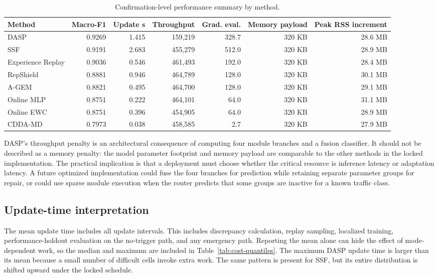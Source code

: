 \begin{table}[t]
\caption{Confirmation-level performance summary by method.}
\label{tab:performance-audit}
\centering
\scriptsize
\begin{tabular}{lrrrrrr}
\toprule
Method & Macro-F1 & Update s & Throughput & Grad. eval. & Memory payload & Peak RSS increment\\
\midrule
DASP & 0.9269 & 1.415 & 159,219 & 328.7 & 320 KB & 28.6 MB\\
SSF & 0.9191 & 2.683 & 455,279 & 512.0 & 320 KB & 28.9 MB\\
Experience Replay & 0.9036 & 0.546 & 461,493 & 192.0 & 320 KB & 28.4 MB\\
RepShield & 0.8881 & 0.946 & 464,789 & 128.0 & 320 KB & 30.1 MB\\
A-GEM & 0.8821 & 0.495 & 464,700 & 128.0 & 320 KB & 29.1 MB\\
Online MLP & 0.8751 & 0.222 & 464,101 & 64.0 & 320 KB & 31.1 MB\\
Online EWC & 0.8751 & 0.396 & 454,905 & 64.0 & 320 KB & 28.9 MB\\
CDDA-MD & 0.7973 & 0.038 & 458,585 & 2.7 & 320 KB & 27.9 MB\\
\bottomrule
\end{tabular}
\end{table}

DASP's throughput penalty is an architectural consequence of computing four module branches and a fusion classifier. It should not be described as a memory penalty: the model parameter footprint and memory payload are comparable to the other methods in the locked implementation. The practical implication is that a deployment must choose whether the critical resource is inference latency or adaptation latency. A future optimized implementation could fuse the four branches for prediction while retaining separate parameter groups for repair, or could use sparse module execution when the router predicts that some groups are inactive for a known traffic class.

\subsection{Update-time interpretation}
The mean update time includes all update intervals. This includes discrepancy calculation, replay sampling, localized training, performance-holdout evaluation on the no-trigger path, and any emergency path. Reporting the mean alone can hide the effect of mode-dependent work, so the median and maximum are included in Table~\ref{tab:cost-quantiles}. The maximum DASP update time is larger than its mean because a small number of difficult cells invoke extra work. The same pattern is present for SSF, but its entire distribution is shifted upward under the locked schedule.

